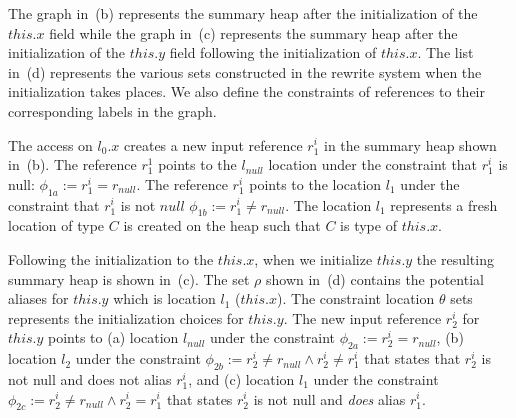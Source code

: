 The graph in~(b) represents the summary heap
after the initialization of the $\mathit{this}.x$ field while the
graph in~(c) represents the summary heap after
the initialization of the $\mathit{this}.y$ field following the
initialization of $\mathit{this}.x$. The list
in~(d) represents the various sets constructed in
the rewrite system when the initialization takes places. We also
define the constraints of references to their corresponding labels in
the graph.

The access on $l_0.x$ creates a new input reference $r_1^i$ in the
summary heap shown in~(b). The reference $r_1^1$
points to the $l_\mathit{null}$ location under the constraint that
$r_1^i$ is null: $\phi_{1a} := r_1^i = r_\mathit{null}$. The reference
$r_1^i$ points to the location $l_1$ under the constraint that $r_1^i$
is not $\mathit{null}$ $\phi_{1b} :=r_1^i \neq r_\mathit{null}$. The
location $l_1$ represents a fresh location of type $C$ is created on
the heap such that $C$ is type of $\mathit{this}.x$.

Following the initialization to the $\mathit{this}.x$, when we
initialize $\mathit{this}.y$ the resulting summary heap is shown
in~(c). The set $\rho$ shown
in~(d) contains the potential aliases for
$\mathit{this}.y$ which is location $l_1$ ($\mathit{this}.x$). The
constraint location $\theta$ sets represents the initialization
choices for $\mathit{this}.y$. The new input reference $r_2^i$ for
$this.y$ points to (a) location $l_\mathit{null}$ under the constraint
$\phi_{2a} := r_2^i = r_\mathit{null}$, (b) location $l_2$ under the
constraint $\phi_{2b} := r_2^i \neq r_\mathit{null} \wedge r_2^i \neq
r_1^i$ that states that $r_2^i$ is not null and does not alias
$r_1^i$, and (c) location $l_1$ under the constraint $\phi_{2c} :=
r_2^i \neq r_\mathit{null} \wedge r_2^i = r_1^i$ that states $r_2^i$
is not null and \emph{does} alias $r_1^i$.





